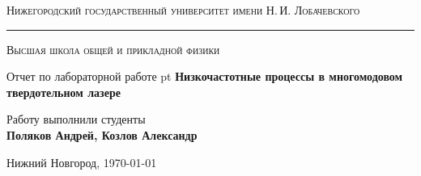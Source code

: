 \begin{titlepage}
    \begin{center}
    {\small\textsc{Нижегородский государственный университет имени Н.\,И. Лобачевского}}
    \vskip 2pt \hrule \vskip 3pt
    {\small\textsc{Высшая школа общей и прикладной физики}}

    \vfill


    {{\large Отчет по лабораторной работе} pt {\Large \bfseries Низкочастотные процессы в многомодовом твердотельном лазере}}

        
    \vspace{2cm}
    {\large Работу выполнили студенты \\[0.5em]{\Large \bfseries Поляков Андрей, Козлов Александр}}

    \end{center}

    \vfill

    \begin{center}
    {Нижний Новгород, \today}
    \end{center}
\end{titlepage}